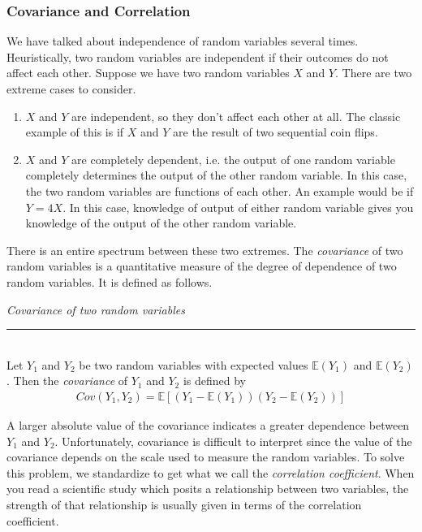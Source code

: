 \documentclass[12pt]{article}
\theoremstyle{definition}
\theoremstyle{remark}
\def\E{{\mathbb E}}
\begin{document}
\subsubsection{Covariance and Correlation}
We have talked about independence of random variables several times. Heuristically, two random variables are independent if their outcomes do not affect each other. Suppose we have two random variables $X$ and $Y$. There are two extreme cases to consider.
\begin{enumerate}
\item $X$ and $Y$ are independent, so they don't affect each other at all. The classic example of this is if $X$ and $Y$ are the result of two sequential coin flips.
\item $X$ and $Y$ are completely dependent, i.e. the output of one random variable completely determines the output of the other random variable. In this case, the two random variables are functions of each other. An example would be if $Y = 4X$. In this case, knowledge of output of either random variable gives you knowledge of the output of the other random variable.
\end{enumerate}
There is an entire spectrum between these two extremes. The \emph{covariance} of two random variables is a quantitative measure of the degree of dependence of two random variables. It is defined as follows.

\begin{framed}
\emph{Covariance of two random variables}\\
  \rule{\dimexpr{}\fboxrule}{.1pt} \\
Let $Y_1$ and $Y_2$ be two random variables with expected values $\E(Y_1)$ and $\E(Y_2)$. Then the \emph{covariance} of $Y_1$ and $Y_2$ is defined by
\begin{align*}
Cov(Y_1, Y_2) = \E[ (Y_1 - \E(Y_1))(Y_2 - \E(Y_2))]
\end{align*}
\end{framed}

A larger absolute value of the covariance indicates a greater dependence between $Y_1$ and $Y_2$. Unfortunately, covariance is difficult to interpret since the value of the covariance depends on the scale used to measure the random variables. To solve this problem, we standardize to get what we call the \emph{correlation coefficient}. When you read a scientific study which posits a relationship between two variables, the strength of that relationship is usually given in terms of the correlation coefficient.
\end{document}

